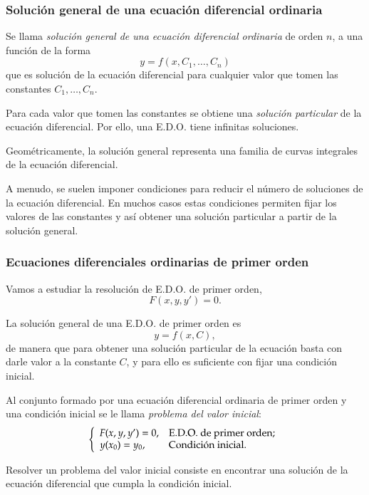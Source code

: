 \begin{frame}
\frametitle{Solución general de una ecuación diferencial ordinaria}
\begin{definicion}
Se llama \emph{solución general de una ecuación diferencial ordinaria} de orden $n$, a una función de la forma 
\[y =f (x,C_1,\ldots,C_n)\] 
que es solución de la ecuación diferencial para cualquier valor que tomen las constantes $C_1,\ldots,C_n$.
\end{definicion}

Para cada valor que tomen las constantes se obtiene una \emph{solución particular} de la ecuación diferencial. Por ello, una E.D.O. tiene infinitas soluciones.

Geométricamente, la solución general representa una familia de curvas integrales de la ecuación diferencial.

A menudo, se suelen imponer condiciones para reducir el número de soluciones de la  ecuación diferencial. En muchos casos estas condiciones permiten fijar los valores de las constantes y así obtener una solución particular a partir de la solución general.
\end{frame}


\begin{frame}
\frametitle{Ecuaciones diferenciales ordinarias de primer orden}
Vamos a estudiar la resolución de E.D.O. de primer orden, 
\[
F(x,y,y')=0.
\]

La solución general de una E.D.O. de primer orden es
\[
y = f (x,C),
\]
de manera que para obtener una solución particular de la ecuación basta con darle valor a la constante $C$, y para ello es suficiente con fijar una condición inicial.

\begin{definicion}
Al conjunto formado por una ecuación diferencial ordinaria de primer orden y una condición inicial se le llama \emph{problema del valor inicial}:
\[
\left\{%
\begin{array}{ll}
    F(x,y,y')=0, & \hbox{E.D.O. de primer orden;} \\
    y(x_0)=y_0, & \hbox{Condición inicial.} \\
\end{array}%
\right.    
\]
\end{definicion}

Resolver un problema del valor inicial consiste en encontrar una solución de la ecuación diferencial que cumpla la condición inicial.
\end{frame}



